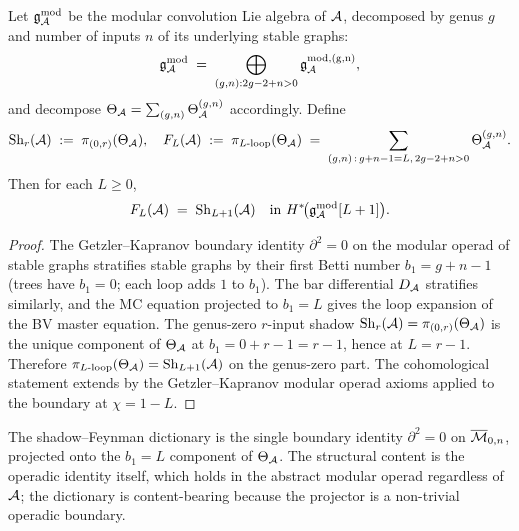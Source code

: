 \begin{theorem}[C4: Shadow--Feynman as $\partial^{2} = 0$ at $b_1 = L$]
\label{thm:c4-shadow-feynman-gk}
\ClaimStatusProvedHere
Let $\mathfrak g^{\rm mod}_{\mathcal{A}}$ be the modular convolution Lie
algebra of $\mathcal{A}$, decomposed by genus $g$ and number of inputs $n$
of its underlying stable graphs:
\[
\mathfrak g^{\rm mod}_{\mathcal{A}} \;=\;
\bigoplus_{(g, n) : 2g - 2 + n > 0}
\mathfrak g^{\rm mod, (g, n)}_{\mathcal{A}},
\]
and decompose $\Theta_{\mathcal{A}} = \sum_{(g, n)} \Theta_{\mathcal{A}}^{(g, n)}$
accordingly. Define
\[
\mathrm{Sh}_r(\mathcal{A}) \;:=\; \pi_{(0, r)}(\Theta_{\mathcal{A}}),
\quad
F_L(\mathcal{A}) \;:=\; \pi_{L\text{-loop}}(\Theta_{\mathcal{A}})
\;=\; \sum_{(g, n)\,:\,g + n - 1 = L,\,2 g - 2 + n > 0}
\Theta_{\mathcal{A}}^{(g, n)}.
\]
Then for each $L \ge 0$,
\[
F_L(\mathcal{A}) \;=\; \mathrm{Sh}_{L+1}(\mathcal{A})
\quad
\text{in } H^{*}\!\bigl(\mathfrak g^{\rm mod}_{\mathcal{A}}[L+1]\bigr).
\]
\end{theorem}

\begin{proof}
The Getzler--Kapranov boundary identity $\partial^{2} = 0$ on the
modular operad of stable graphs stratifies stable graphs by their
first Betti number $b_1 = g + n - 1$ (trees have $b_1 = 0$; each
loop adds $1$ to $b_1$). The bar differential $D_{\mathcal{A}}$ stratifies
similarly, and the MC equation projected to $b_1 = L$ gives the loop
expansion of the BV master equation. The genus-zero $r$-input shadow
$\mathrm{Sh}_r(\mathcal{A}) = \pi_{(0, r)}(\Theta_{\mathcal{A}})$ is the unique component of
$\Theta_{\mathcal{A}}$ at $b_1 = 0 + r - 1 = r - 1$, hence at $L = r - 1$.
Therefore $\pi_{L\text{-loop}}(\Theta_{\mathcal{A}}) = \mathrm{Sh}_{L+1}(\mathcal{A})$ on the
genus-zero part. The cohomological statement extends by the
Getzler--Kapranov modular operad axioms applied to the boundary at
$\chi = 1 - L$.
\end{proof}

\begin{remark}
\label{rem:dictionary-operadic-identity}
The shadow--Feynman dictionary is the single boundary identity
$\partial^{2} = 0$ on $\overline{\mathcal{M}}_{0, n}$, projected onto the
$b_1 = L$ component of $\Theta_{\mathcal{A}}$. The structural content is the
operadic identity itself, which holds in the abstract modular operad
regardless of $\mathcal{A}$; the dictionary is content-bearing because the
projector is a non-trivial operadic boundary.
\end{remark}

